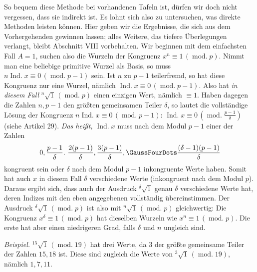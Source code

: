 So bequem diese Methode bei vorhandenen Tafeln ist, dürfen wir doch nicht vergessen, dass sie indirekt ist. Es lohnt sich also zu untersuchen, was direkte Methoden leisten können. Hier geben wir die Ergebnisse, die sich aus dem Vorhergehenden gewinnen lassen; alles Weitere, das tiefere Überlegungen verlangt, bleibt Abschnitt VIII vorbehalten. Wir beginnen mit dem einfachsten Fall $A=1$, suchen also die Wurzeln der Kongruenz $x^n\equiv1\,(\operatorname{mod.}p)$. Nimmt man eine beliebige primitive Wurzel als Basis, so muss $n\operatorname{Ind.}x\equiv0\,(\operatorname{mod.}p-1)$ sein. Ist $n$ zu $p-1$ teilerfremd, so hat diese Kongruenz nur eine Wurzel, nämlich $\operatorname{Ind.}x\equiv0\,(\operatorname{mod.}p-1)$. Also hat \emph{in diesem Fall} ${}^{n}\!\surd1\,(\operatorname{mod.}p)$ einen einzigen Wert, nämlich $\equiv1$. Haben dagegen die Zahlen $n,p-1$ den größten gemeinsamen Teiler $\delta$, so lautet die vollständige Lösung der Kongruenz $n\operatorname{Ind.}x\equiv0\,(\operatorname{mod.}p-1)$: $\operatorname{Ind.}x\equiv0\,(\operatorname{mod.}\frac{p-1}{\delta})$ (siehe Artikel 29). \emph{Das heißt,} $\operatorname{Ind.}x$ muss nach dem Modul $p-1$ einer der Zahlen
\[0,\frac{p-1}{\delta}.\ \frac{2(p-1)}{\delta},\frac{3(p-1)}{\delta},\GaussFourDots\frac{(\delta-1)(p-1)}{\delta}\]
kongruent sein oder $\delta$ nach dem Modul $p-1$ inkongruente Werte haben. Somit hat auch $x$ in diesem Fall $\delta$ verschiedene Werte (inkongruent nach dem Modul
$p$). Daraus ergibt sich, dass auch der Ausdruck ${}^{\delta}\!\surd {1}$ genau $\delta$ verschiedene Werte hat, deren Indizes mit den eben angegebenen vollständig übereinstimmen. Der Ausdruck ${}^{\delta}\!\surd {1}\,(\operatorname{mod.}p)$ ist also mit ${}^{n}\!\surd {1}\,(\operatorname{mod.}p)$ gleichwertig: Die Kongruenz $x^\delta\equiv1\,(\operatorname{mod.}p)$ hat dieselben Wurzeln wie $x^n\equiv1\,(\operatorname{mod.}p)$. Die erste hat aber einen niedrigeren Grad, falls $\delta$ und $n$ ungleich sind.

\emph{Beispiel.} ${}^{15}\!\surd {1}\,(\operatorname{mod.}19)$ hat drei Werte, da $3$ der größte gemeinsame Teiler der Zahlen $15,18$ ist. Diese sind zugleich die Werte von ${}^{3}\!\surd {1}\,(\operatorname{mod.}19)$, nämlich $1,7,11$.


